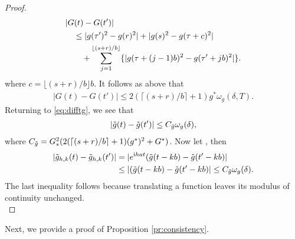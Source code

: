 \begin{proof}
\begin{align}
  &\vert G(t) - G(t') \vert \notag \\
  &\quad \le \vert g(\tau')^2 - g(r)^2\vert +   \vert g(s)^2 - g(\tau + c)^2 \vert\notag \\
  &\qquad +\sum_{j = 1}^{\lfloor (s + r)/b \rfloor} \{\vert g(\tau + (j-1) b)^2 - g(\tau' + j b)^2\vert\}.  \notag
  \label{}
\end{align}
where $c = \lfloor (s + r)/b \rfloor b $. It follows as above that 
\begin{align}
\vert G(t) - G(t') \vert \le 2 (\lceil (s + r)/b\rceil +1)g^*\omega_g(\delta, T).
\end{align}
Returning to \eqref{eq:difftg}, we see that
\begin{align}
  \vert \tilde{g}(t) - \tilde{g}(t')\vert \le C_{\tilde{g}} \omega_g(\delta),\notag
  \label{}
\end{align}
where $C_{\tilde{g}} = G_*^2(2 (\lceil (s + r)/b\rceil +1)(g^*)^2 + G^*)$. Now let \hkints, then
\begin{align}
  \vert \tilde{g}_{h,k}(t) - \tilde{g}_{h,k}(t')\vert & = \vert e^{\mathrm{i} h a t} (\tilde{g}(t - kb) -\tilde{g}(t'-kb) \vert\notag\\
  &\le \vert (\tilde{g}(t - kb) -\tilde{g}(t'-kb) \vert \le C_{\tilde{g}} \omega_g(\delta).
  \label{}
\end{align}
The last inequality follows because translating a function leaves its modulus of continuity unchanged.\\
\end{proof}
Next, we provide a proof of Proposition \eqref{pr:consistency}. \\\\
